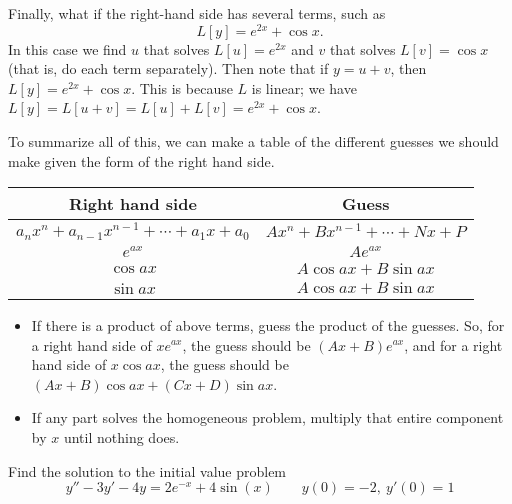 \documentclass{ximera}
\begin{document}
Finally, what if the right-hand side has several terms, such as
\begin{equation*}
    L[y] = e^{2x} + \cos x .
\end{equation*}
In this case we find $u$ that solves $L[u] = e^{2x}$ and $v$ that solves $L[v] = \cos x$ (that is, do each term separately).  Then note that if $y = u+ v$, then $L[y] = e^{2x} + \cos x$.  This is because $L$ is linear; we have $L[y] = L[u+v] = L[u] + L[v] = e^{2x} + \cos x$.

To summarize all of this, we can make a table of the different guesses we should make given the form of the right hand side.

\begin{table}[h!]
    \begin{center}
        \begin{tabular}{|c|c|}\hline
            \textbf{Right hand side} & \textbf{Guess}  \\\hline 
            $a_nx^n + a_{n-1}x^{n-1} + \cdots  + a_1x + a_0$ & $Ax^n + Bx^{n-1} + \cdots + Nx + P$ \\
            $e^{ax}$ & $Ae^{ax}$ \\
            $\cos{ax}$ & $A\cos{ax} + B\sin{ax}$ \\
            $\sin{ax}$ & $A\cos{ax} + B\sin{ax}$ \\\hline
        \end{tabular}
    \end{center}
    \begin{itemize}
        \item If there is a product of above terms, guess the product of the guesses. So, for a right hand side of $ xe^{ax}$, the guess should be $(Ax + B)e^{ax}$, and for a right hand side of $x\cos{ax}$, the guess should be $(Ax + B)\cos{ax} + (Cx+D)\sin{ax}$.
        \item If any part solves the homogeneous problem, multiply that entire component by $x$ until nothing does.
    \end{itemize}
\end{table}

\begin{example}
    Find the solution to the initial value problem
    \begin{equation*}
        y'' - 3y' - 4y = 2e^{-x} + 4 \sin(x) \qquad y(0) = -2,\ y'(0) = 1
    \end{equation*}
\end{example}
\end{document}
